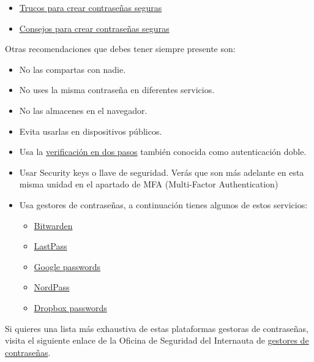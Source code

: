 \documentclass[
  a4paper,
  openany]{book}
\providecommand{\tightlist}{%
  \setlength{\itemsep}{0pt}\setlength{\parskip}{0pt}}
\begin{document}
\begin{itemize}
\item
  \href{https://www.pandasecurity.com/es/mediacenter/seguridad/10-trucos-para-crear-contrasenas-seguras/}{Trucos para crear contraseñas seguras}
\item
  \href{https://www.genbeta.com/seguridad/especial-contrasenas-seguras-consejos-para-mejorar-la-seguridad-de-tus-contrasenas}{Consejos para crear contraseñas seguras}
\end{itemize}

Otras recomendaciones que debes tener siempre presente son:

\begin{itemize}
\item
  No las compartas con nadie.
\item
  No uses la misma contraseña en diferentes servicios.
\item
  No las almacenes en el navegador.
\item
  Evita usarlas en dispositivos públicos.
\item
  Usa la \href{https://www.osi.es/es/actualidad/blog/2019/02/27/el-factor-de-autenticacion-doble-y-multiple}{verificación en dos pasos} también conocida como autenticación doble.
\item
  Usar Security keys o llave de seguridad. Verás que son más adelante en esta misma unidad en el apartado de MFA (Multi-Factor Authentication)
\item
  Usa gestores de contraseñas, a continuación tienes algunos de estos servicios:

  \begin{itemize}
  \tightlist
  \item
    \href{https://bitwarden.com/}{Bitwarden}
  \item
    \href{https://www.lastpass.com/es/}{LastPass}
  \item
    \href{https://passwords.google.com/}{Google passwords}
  \item
    \href{https://nordpass.com/homepage/}{NordPass}
  \item
    \href{https://www.dropbox.com/es_ES/features/security/passwords}{Dropbox passwords}
  \end{itemize}
\end{itemize}

Si quieres una lista más exhaustiva de estas plataformas gestoras de contraseñas, visita el siguiente enlace de la Oficina de Seguridad del Internauta de \href{https://www.osi.es/es/herramientas-gratuitas/categoria/privacidad-y-seguridad-de-datos/cifrado-de-datos-y-gestion-de-contrasenas}{gestores de contraseñas}.
\end{document}
